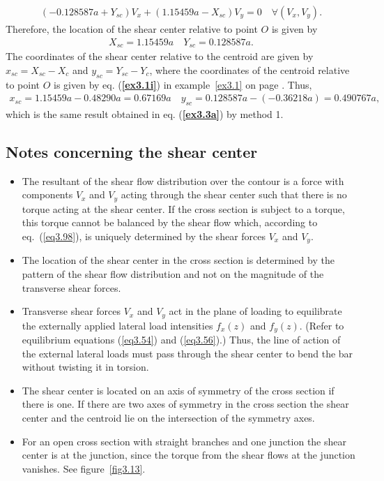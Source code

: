 \documentclass{AeroStructure-ERJohnson}
\begin{document}
\begin{example}
\begin{align}\label{ex3.3d}
\left(-0.128587 a+Y_{s c}\right) V_{x}+\left(1.15459 a-X_{s c}\right) V_{y}=0 \quad \forall\left(V_{x}, V_{y}\right). \tag{d}
\end{align}
Therefore, the location of the shear center relative to point $O$ is given by
\begin{align}\label{ex3.3e}
X_{s c}=1.15459 a \quad Y_{s c}=0.128587 a. \tag{e}
\end{align}
The coordinates of the shear center relative to the centroid are given by $x_{s c}=X_{s c}-X_{c}$ and $y_{s c}=Y_{s c}-Y_{c}$, where the coordinates of the centroid relative to point $O$ is given by eq. (\textbf{\ref{ex3.1i}}) in example~\ref{ex3.1} on page \pageref{ex3.1}. Thus,
\begin{align}\label{ex3.3f}
x_{s c}=1.15459 a-0.48290 a=0.67169 a \quad y_{s c}=0.128587 a-(-0.36218 a)=0.490767 a, \tag{f}
\end{align}
which is the same result obtained in eq. (\textbf{\ref{ex3.3a}}) by method 1.
\end{example}

\subsection{Notes concerning the shear center}\label{sec3.8.3}

\begin{itemize}
\item The resultant of the shear flow distribution over the contour is a force with components $V_x$ and $V_y$ acting through the shear center such that there is no torque acting at the shear center. If the cross section is subject to a torque, this torque cannot be balanced by the shear flow which, according to eq.~(\ref{eq3.98}), is uniquely determined by the shear forces $V_x$ and $V_y$.

\item The location of the shear center in the cross section is determined by the pattern of the shear flow distribution and not on the magnitude of the transverse shear forces.

\item Transverse shear forces $V_x$ and $V_y$ act in the plane of loading to equilibrate the externally applied lateral load intensities $f_{x}(z)$ and $f_{y}(z)$. (Refer to equilibrium equations (\ref{eq3.54}) and (\ref{eq3.56}).) Thus, the line of action of the external lateral loads must pass through the shear center to bend the bar without twisting it in torsion.

\item The shear center is located on an axis of symmetry of the cross section if there is one. If there are two axes of symmetry in the cross section the shear center and the centroid lie on the intersection of the symmetry axes.

\item For an open cross section with straight branches and one junction the shear center is at the junction, since the torque from the shear flows at the junction vanishes. See figure~\ref{fig3.13}.
\end{itemize}
\end{document}
